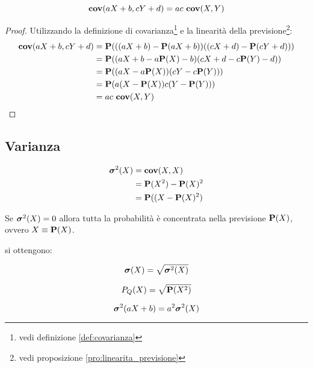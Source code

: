 \begin{proposition}
  \label{pro:trasformazione_lineare_covarianza}
  \[ \mathbf{cov}(aX + b, cY + d) = ac ~ \mathbf{cov}(X,Y) \]
\end{proposition}

\begin{proof}
  Utilizzando la definizione di covarianza\footnote{vedi definizione \ref{def:covarianza}} e la linearità della previsione\footnote{vedi proposizione \ref{pro:linearita_previsione}}:
  \begin{align*}
    \mathbf{cov}(aX + b, cY + d) &= \mathbf{P}(((aX + b) - \mathbf{P}(aX + b))((cX + d) - \mathbf{P}(cY + d))) \\
    &= \mathbf{P}((aX + b - a\mathbf{P}(X) - b)(cX + d - c\mathbf{P}(Y) - d)) \\
    &= \mathbf{P}((aX - a\mathbf{P}(X))(cY - c\mathbf{P}(Y))) \\
    &= \mathbf{P}(a(X - \mathbf{P}(X)) c(Y - \mathbf{P}(Y))) \\
    &= ac ~ \mathbf{cov}(X,Y)
  \end{align*}
\end{proof}

\subsection{Varianza}
\begin{definition}[Varianza]\label{def:varianza}
  \begin{align*}
    \boldsymbol\sigma^2(X) &= \mathbf{cov}(X,X) \\
    &= \mathbf{P}(X^2) - \mathbf{P}(X)^2 \\
    &= \mathbf{P}((X - \mathbf{P}(X)^2)
  \end{align*}
\end{definition}
Se \( \boldsymbol\sigma^2(X) = 0 \) allora tutta la probabilità è concentrata nella previsione \( \mathbf{P}(X) \), ovvero \( X \equiv \mathbf{P}(X) \).

 si ottengono:
\begin{definition}\label{def:scarto_quadratico_medio}
  \[ \boldsymbol\sigma(X) = \sqrt{\boldsymbol\sigma^2(X)} \]
\end{definition}

\begin{definition}\label{def:previsione_quadratica}
  \[ P_Q(X) = \sqrt{\mathbf{P}(X^2)} \]
\end{definition}

\begin{proposition}
  \label{pro:trasformazione_lineare_varianza}
  \[ \boldsymbol\sigma^2(aX + b) = a^2 \boldsymbol\sigma^2(X) \]
\end{proposition}


